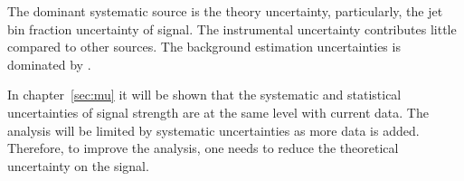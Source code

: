 The dominant systematic source is the theory uncertainty, particularly, 
the jet bin fraction uncertainty of signal. 
The instrumental uncertainty contributes little compared to other sources. 
The background estimation uncertainties is dominated by \Wjets.  

In chapter~\ref{sec:mu} it will be shown that the systematic 
and statistical uncertainties of signal strength are at the same level 
with current data. The analysis will be limited by systematic 
uncertainties as more data is added. Therefore, to improve the analysis, 
one needs to reduce the theoretical uncertainty on the signal.
